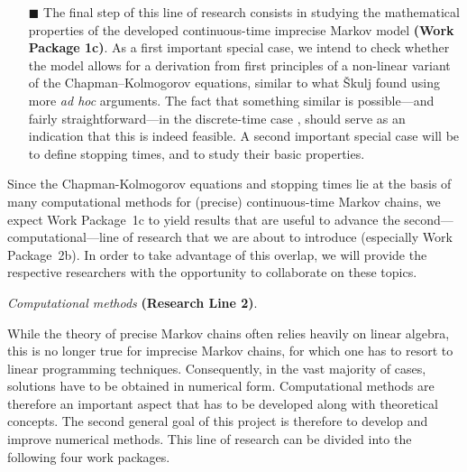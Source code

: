 \documentclass[11pt,dvipsnames,usenames,a4paper]{article}
\begin{document}
\begin{itemize}
\item[\tiny$\blacksquare$]
The final step of this line of research consists in studying the mathematical properties of the developed continuous-time imprecise Markov model {\bf(Work Package 1c)}.
As a first important special case, we intend to check whether the model allows for a derivation from first principles of a non-linear variant of the Chapman--Kolmogorov equations, similar to what \v{S}kulj \cite{skulj2015:continuous:bounds} found using more {\itshape ad hoc} arguments.
The fact that something similar is possible---and fairly straightforward---in the discrete-time case \cite{cooman2008}, should serve as an indication that this is indeed feasible. A second important special case will be to define stopping times, and to study their basic properties.\vspace{8pt}
\end{itemize}

Since the Chapman-Kolmogorov equations and stopping times lie at the basis of many computational methods for (precise) continuous-time Markov chains, we expect Work Package~1c to yield results that are useful to advance the second---computational---line of research that we are about to introduce (especially Work Package~2b). In order to take advantage of this overlap, we will provide the respective researchers with the opportunity to collaborate on these topics.


\vspace{8pt}


\emph{Computational methods} {\bf (Research Line 2)}.
\vspace{3pt}

While the theory of precise Markov chains often relies heavily on linear algebra, this is no longer true for imprecise Markov chains, for which one has to resort to linear programming techniques. Consequently, in the vast majority of cases, solutions have to be obtained in numerical form.
Computational methods are therefore an important aspect that has to be developed along with theoretical concepts. 
The second general goal of this project is therefore to develop and improve numerical methods. This line of research can be divided into the following four work packages.




\end{document}
